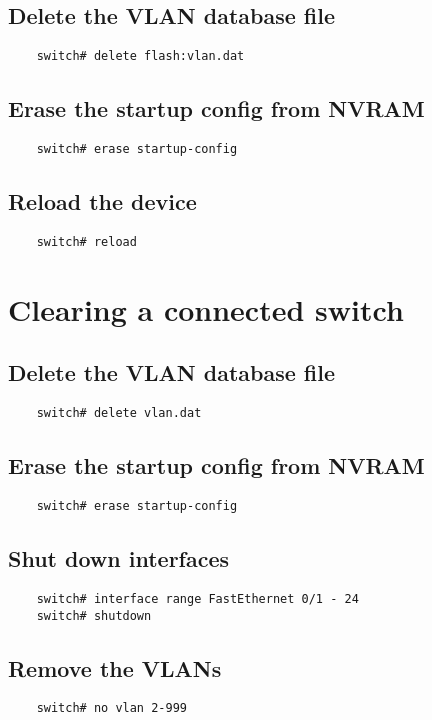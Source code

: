 \documentclass{article}
\begin{document}
\subsection{Delete the VLAN database file}
\begin{verbatim}
	switch# delete flash:vlan.dat
\end{verbatim}

\subsection{Erase the startup config from NVRAM}
\begin{verbatim}
	switch# erase startup-config
\end{verbatim}

\subsection{Reload the device}
\begin{verbatim}
	switch# reload
\end{verbatim}

\section{Clearing a connected switch}
\subsection{Delete the VLAN database file}
\begin{verbatim}
	switch# delete vlan.dat
\end{verbatim}

\subsection{Erase the startup config from NVRAM}
\begin{verbatim}
	switch# erase startup-config
\end{verbatim}

\subsection{Shut down interfaces}
\begin{verbatim}
	switch# interface range FastEthernet 0/1 - 24
	switch# shutdown
\end{verbatim}

\subsection{Remove the VLANs}
\begin{verbatim}
	switch# no vlan 2-999
\end{verbatim}
\end{document}

